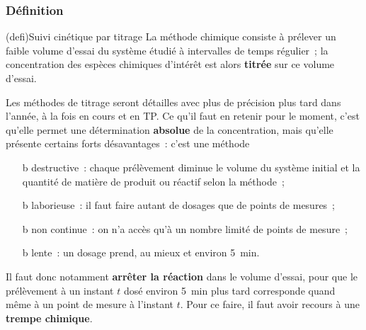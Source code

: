 \documentclass[../../main/main.tex]{subfiles}
\begin{document}
\subsubsection{Définition}
\begin{tcb}[label=def:titrage](defi){Suivi cinétique par titrage}
	La méthode chimique consiste à prélever un faible volume d'essai du système
	étudié à intervalles de temps régulier~; la concentration des espèces
	chimiques d'intérêt est alors \textbf{titrée} sur ce volume d'essai.
\end{tcb}
Les méthodes de titrage seront détailles avec plus de précision plus tard dans
l'année, à la fois en cours et en TP. Ce qu'il faut en retenir pour le moment,
c'est qu'elle permet une détermination \textbf{absolue} de la concentration,
mais qu'elle présente certains forts désavantages~: c'est une méthode
\begin{itemize}
	\item[b]{destructive}~: chaque prélèvement diminue le volume du système
	      initial et la quantité de matière de produit ou réactif selon la
	      méthode~;
	\item[b]{laborieuse}~: il faut faire autant de dosages que de points de
	      mesures~;
	\item[b]{non continue}~: on n'a accès qu'à un nombre limité de points de
	      mesure~;
	\item[b]{lente}~: un dosage prend, au mieux et environ \SI{5}{min}.
\end{itemize}
Il faut donc notamment \textbf{arrêter la réaction} dans le volume d'essai, pour
que le prélèvement à un instant $t$ dosé environ \SI{5}{min} plus tard
corresponde quand même à un point de mesure à l'instant $t$. Pour ce faire, il
faut avoir recours à une \textbf{trempe chimique}.
\end{document}
